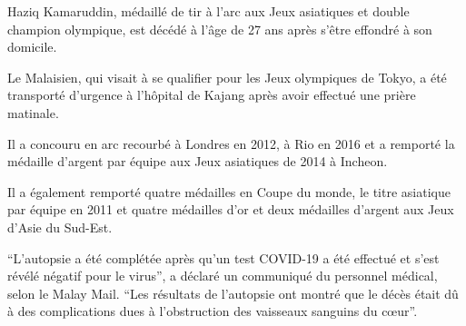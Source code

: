 Haziq Kamaruddin, médaillé de tir à l'arc aux Jeux asiatiques et double champion
olympique, est décédé à l'âge de 27 ans après s'être effondré à son domicile.

Le Malaisien, qui visait à se qualifier pour les Jeux olympiques de Tokyo, a été
transporté d'urgence à l'hôpital de Kajang après avoir effectué une prière
matinale.

Il a concouru en arc recourbé à Londres en 2012, à Rio en 2016 et a remporté la
médaille d'argent par équipe aux Jeux asiatiques de 2014 à Incheon.

Il a également remporté quatre médailles en Coupe du monde, le titre asiatique
par équipe en 2011 et quatre médailles d'or et deux médailles d'argent aux Jeux
d'Asie du Sud-Est.

``L'autopsie a été complétée après qu'un test COVID-19 a été effectué et s'est
révélé négatif pour le virus'', a déclaré un communiqué du personnel médical,
selon le Malay Mail. ``Les résultats de l'autopsie ont montré que le décès était
dû à des complications dues à l'obstruction des vaisseaux sanguins du cœur''.

